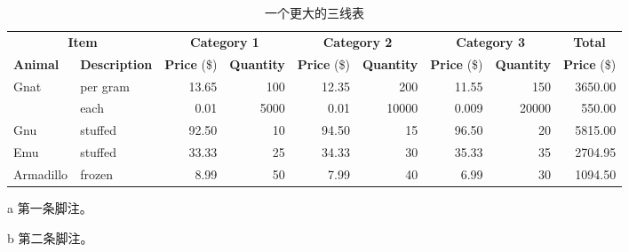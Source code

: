 \begin{table}[!htb]
  \centering
  \begin{threeparttable}[b]
    \caption{一个更大的三线表}
    \label{tab:bigtable}
    \begin{tabular}{@{}llrrrrrrr@{}} \toprule
      \multicolumn{2}{c}{\textbf{Item}} & \multicolumn{2}{c}{\textbf{Category 1}} & \multicolumn{2}{c}{\textbf{Category 2}} & \multicolumn{2}{c}{\textbf{Category 3}} & \multicolumn{1}{c}{\textbf{Total}}                                                                                     \\ \cmidrule(r){1-2} \cmidrule(lr){3-4} \cmidrule(lr){5-6} \cmidrule(lr){7-8} \cmidrule(l){9-9}
      \textbf{Animal}                   & \textbf{Description}                    & \textbf{Price} (\$)                     & \textbf{Quantity}                       & \textbf{Price} (\$)                & \textbf{Quantity} & \textbf{Price} (\$) & \textbf{Quantity} & \textbf{Price} (\$) \\ \midrule
      Gnat                              & per gram\tnote{a}                       & 13.65                                   & 100                                     & 12.35                              & 200               & 11.55               & 150               & 3650.00             \\
                                        & each                                    & 0.01                                    & 5000                                    & 0.01                               & 10000             & 0.009               & 20000             & 550.00              \\
      Gnu                               & stuffed                                 & 92.50                                   & 10                                      & 94.50                              & 15                & 96.50               & 20                & 5815.00             \\
      Emu                               & stuffed                                 & 33.33                                   & 25                                      & 34.33                              & 30                & 35.33               & 35                & 2704.95             \\
      Armadillo                         & frozen                                  & 8.99                                    & 50                                      & 7.99                               & 40                & 6.99                & 30\tnote{b}       & 1094.50             \\ \bottomrule
    \end{tabular}
    \begin{tablenotes}
      \item [a] 第一条脚注。
      \item [b] 第二条脚注。
    \end{tablenotes}
  \end{threeparttable}
\end{table}

